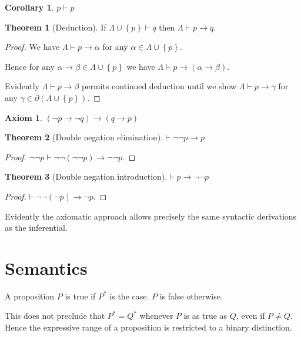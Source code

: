 \documentclass{amsbook}
\newcommand{\setsm}[1]{\left\{#1\right\}}
\newcommand{\infers}{\mathrel\vdash}
\newcommand{\theorem}{\mathord\vdash\medspace}
\newcommand{\then}{\mathrel\rightarrow}
\theoremstyle{definition}
\newtheorem{axm}{Axiom}[chapter]
\newtheorem{thm}{Theorem}[section]
\newtheorem{crl}{Corollary}[section]
\begin{document}
\begin{crl}
    $p \infers p$
\end{crl}

\begin{thm}[Deduction]
    If $\varLambda \cup \setsm p \infers q$ then $\varLambda \infers p \then q$.
    \begin{proof}
        We have $\varLambda \infers p \then \alpha$ for any $\alpha \in \varLambda \cup \setsm p$.

        Hence for any $\alpha \then \beta \in \varLambda \cup \setsm p$ we have $\varLambda \infers p \then (\alpha \then \beta)$.

        Evidently $\varLambda \infers p \then \beta$ permits continued deduction until we show $\varLambda \infers p \then \gamma$ for any $\gamma \in \partial(\varLambda \cup \setsm p)$.
    \end{proof}
\end{thm}

\begin{axm}
    $(\neg p \then \neg q) \then (q \then p)$
\end{axm}

\begin{thm}[Double negation elimination]
    $\theorem \neg\neg p \then p$
    \begin{proof}
        $\neg\neg p \infers \neg\neg(\neg\neg p) \then \neg\neg p$.
    \end{proof}
\end{thm}

\begin{thm}[Double negation introduction]
    $\theorem p \then \neg\neg p$
    \begin{proof}
        $\theorem \neg\neg(\neg p) \then \neg p$.
    \end{proof}
\end{thm}

Evidently the axiomatic approach allows precisely the same syntactic derivations as the inferential.


\section{Semantics}

A proposition $P$ is true if $P^*$ is the case. $P$ is false otherwise.

This does not preclude that $P^* = Q^*$ whenever $P$ is as true as $Q$, even if $P \neq Q$.
Hence the expressive range of a proposition is restricted to a binary distinction.
\end{document}
